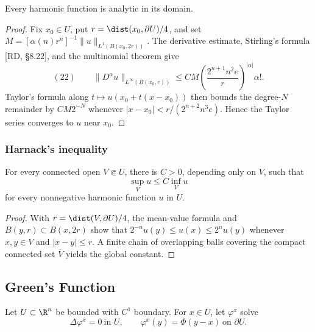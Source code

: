 \begin{theorem}[Analyticity]
\label{thm:harmonic-functions-analytic}
Every harmonic function is analytic in its domain.
\end{theorem}
\begin{proof}
\sketch Fix $x_0\in U$, put $r=\dist(x_0,\partial U)/4$, and set
$M=[\alpha(n)r^n]^{-1}\|u\|_{L^1(B(x_0,2r))}$. The derivative estimate,
Stirling's formula [RD, \S8.22], and the multinomial theorem give
$$(22)\qquad
\|D^\alpha u\|_{L^\infty(B(x_0,r))}
\le CM\left(\frac{2^{n+1}n^2e}{r}\right)^{|\alpha|}\alpha!.$$
Taylor's formula along $t\mapsto u(x_0+t(x-x_0))$ then bounds the degree-$N$
remainder by $CM2^{-N}$ whenever
$|x-x_0|<r/(2^{n+2}n^3e)$. Hence the Taylor series converges to $u$ near
$x_0$.
\end{proof}

\subsubsection{Harnack's inequality}
\label{sec:laplace-harnacks-inequality}

\begin{theorem}
\label{thm:harnacks-inequality}
\leanok
{}
For every connected open $V\Subset U$, there is $C>0$, depending only on
$V$, such that
$$\sup_Vu\le C\inf_Vu$$
for every nonnegative harmonic function $u$ in $U$.
\end{theorem}
\begin{proof}
\leanok
\sketch With $r=\dist(V,\partial U)/4$, the mean-value formula and
$B(y,r)\subset B(x,2r)$ show that $2^{-n}u(y)\le u(x)\le2^n u(y)$ whenever
$x,y\in V$ and $|x-y|\le r$. A finite chain of overlapping balls covering the
compact connected set $\overline V$ yields the global constant.
\end{proof}

\subsection{Green's Function}
\label{sec:laplace-greens-function}

Let $U\subset\R^n$ be bounded with $C^1$ boundary. For $x\in U$, let
$\varphi^x$ solve
$$\Delta\varphi^x=0\ \text{in }U,
\qquad
\varphi^x(y)=\Phi(y-x)\ \text{on }\partial U.$$

